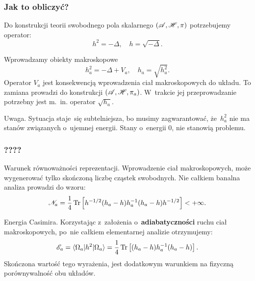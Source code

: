 \documentclass[10pt,t]{beamer}
\begin{document}
\begin{frame}
  \frametitle{Jak to obliczyć?}


  Do konstrukcji teorii swobodnego pola skalarnego $( \mathcal{A}, \mathcal{H}, \pi )$
  potrzebujemy operator:
  \begin{equation}
    \label{eq:Efekt-Casimira-11}
    h^{ 2 } = -\Delta, \quad
    h = \sqrt{ -\Delta }.
  \end{equation}

  Wprowadzamy obiekty makroskopowe
  \begin{equation}
    \label{eq:Efekt-Casimira-12}
    h_{ a }^{ 2 } = -\Delta + V_{ a }, \quad
    h_{ a } = \sqrt{ h_{ a }^{ 2 } }.
  \end{equation}
  Operator $V_{ a }$ jest konsekwencją wprowadzenia ciał
  makroskopowych do układu. To zamiana prowadzi do konstrukcji
  $( \mathcal{A}, \mathcal{H}, \pi_{ a } )$. W~trakcie jej przeprowadzanie potrzebny
  jest m.~in. operator $\sqrt{ h_{ a } }$.

  Uwaga. Sytuacja staje~się subtelniejsza, bo musimy zagwarantować,
  że~$h_{ a }^{ 2 }$ nie ma stanów związanych o~ujemnej energii.
  Stany o~energii 0, nie stanowią problemu.

\end{frame}





\begin{frame}
  \frametitle{????}


  Warunek równoważności reprezentacji. Wprowadzenie ciał makroskopowych,
  może wygenerować tylko skończoną liczbę cząstek swobodnych. Nie całkiem
  banalna analiza prowadzi do wzoru:
  \begin{equation}
    \label{eq:Efekt-Casimira-13}
    \mathcal{N}_{ a } =
    \frac{ 1 }{ 4 } \operatorname{Tr}\left[ h^{ -1/2 } ( h_{ a } - h ) h_{ a }^{ -1 }
      ( h_{ a } - h ) h^{ -1/2 } \right]
    < +\infty.
  \end{equation}



  Energia Casimira. Korzystając z~założenia o~\textbf{adiabatyczności}
  ruchu ciał makroskopowych, po~nie całkiem elementarnej analizie
  otrzymujemy:
  \begin{equation}
    \label{eq:Efekt-Casimira-14}
    \mathcal{E}_{ a } =
    \langle \Omega_{ a } | h^{ 2 } | \Omega_{ a } \rangle =
    \frac{ 1 }{ 4 } \operatorname{Tr}\left[ ( h_{ a } - h ) h_{ a }^{ -1 }
      ( h_{ a } - h ) \right].
  \end{equation}
  Skończona wartość tego wyrażenia, jest dodatkowym warunkiem na
  fizyczną porównywalność obu układów.

\end{frame}
\end{document}
